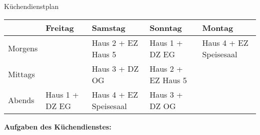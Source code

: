 \documentclass[a4paper,parskip=half]{scrartcl}
\begin{document}
\vfill

\begin{center}
    \Huge Küchendienstplan
\end{center}
\bigskip
\Large \renewcommand{\arraystretch}{2.3}
\begin{tabularx}{\textwidth}{|l|X|X|X|X|}
\hline
        & \textbf{Freitag} & \textbf{Samstag}       & \textbf{Sonntag}   & \textbf{Montag} \\ \hline
Morgens &                  & Haus 2 + EZ Haus 5     & Haus 1 + DZ EG     & Haus 4 + EZ Speisesaal\\  \hline
Mittags &                  & Haus 3 + DZ OG         & Haus 2 + EZ Haus 5 & \\ \hline
Abends  & Haus 1 + DZ EG   & Haus 4 + EZ Speisesaal & Haus 3 + DZ OG     & \\ \hline
\end{tabularx}
\vfill


\newpage

\textbf{Aufgaben des Küchendienstes:}
\end{document}
